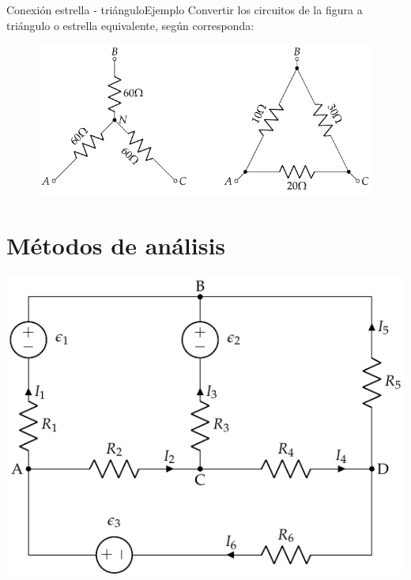 \documentclass[aspectratio=169, xcolor={usenames,svgnames,dvipsnames}]{beamer}
\begin{document}

\begin{frame}{Conexión estrella - triángulo}{Ejemplo}
    Convertir los circuitos de la figura a triángulo o estrella equivalente, según corresponda:
     \begin{figure}[H]
     	\centering
        \includegraphics{../figs/ej7_BT1.pdf}
     \end{figure}
\end{frame}


\section{Métodos de análisis}

\begin{frame}
    \begin{center}
    \includegraphics[height=0.95\textheight]{../figs/mallas1.pdf}
    \end{center}
\end{frame}
\end{document}
